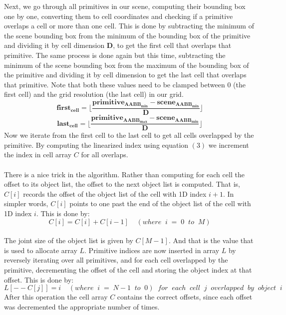 \documentclass[11pt,a4paper]{article}
\begin{document}
Next, we go through all primitives in our scene, computing their bounding box one by one, converting them to cell coordinates and checking if a primitive overlaps a cell or more than one cell. This is done by subtracting the minimum of the scene bounding box from the minimum of the bounding box of the primitive and dividing it by cell dimension $\boldsymbol{D}$, to get the first cell that overlaps that primitive. The same process is done again but this time, subtracting the minimum of the scene bounding box from the maximum of the bounding box of the primitive and dividing it by cell dimension to get the last cell that overlaps that primitive. Note that both these values need to be clamped between $0$ (the first cell) and the grid resolution (the last cell) in our grid.
\begin{equation}
	\boldsymbol{first_{cell}} = \lfloor \frac{\boldsymbol{primitive_{AABB_{min}}} - \boldsymbol{scene_{AABB_{min}}}}{\boldsymbol{D}} \rfloor
\end{equation} 
\begin{equation}
	\boldsymbol{last_{cell}} = \lfloor \frac{\boldsymbol{primitive_{AABB_{max}}} - \boldsymbol{scene_{AABB_{min}}}}{\boldsymbol{D}} \rfloor
\end{equation} 
\noindent
Now we iterate from the first cell to the last cell to get all cells overlapped by the primitive. By computing the linearized index using equation $(3)$ we increment the index in cell array $C$ for all overlaps.
\\
\noindent
\\
There is a nice trick in the algorithm. Rather than computing for each cell the offset to its object list, the offset to the next object list is computed. That is, $C[i]$ records the offset of the object list of the cell with 1D index $i+1$. In simpler words, $C[i]$ points to one past the end of the object list of the cell with 1D index $i$. This is done by:
\begin{equation}
C[i] = C[i] + C[i-1]\;\;\;\;(where\;\;i\;=\;0\;\;to\;\;M)
\end{equation}
\\
\noindent
The joint size of the object list is given by $C[M - 1]$. And that is the value that is used to allocate array $L$. Primitive indices are now inserted in array $L$ by reversely iterating over all primitives, and for each cell overlapped by the primitive, decrementing the offset of the cell and storing the object index at that offset. This is done by:
\begin{equation}
L[--C[j]] = i\;\;\;\;(where\;\;i\;=\;N-1\;\;to\;\;0)\;\;for\;\;each\;\;cell\;\;j\;\;overlapped\;\;by\;\;object\;\;i
\end{equation}
After this operation the cell array $C$ contains the correct offsets, since each offset was decremented the appropriate number of times.
\end{document}
